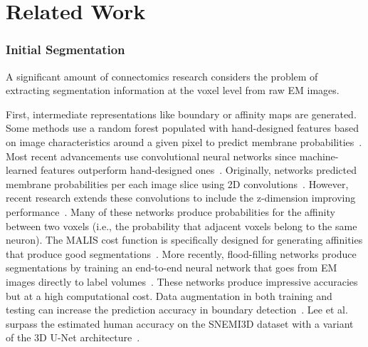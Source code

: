 
\section{Related Work}


\subsubsection{Initial Segmentation}
A significant amount of connectomics research considers the problem of extracting segmentation information at the voxel level from raw EM images.

First, intermediate representations like boundary or affinity maps are generated. Some methods use a random forest populated with hand-designed features based on image characteristics around a given pixel to predict membrane probabilities~\cite{kaynig2015large}.
Most recent advancements use convolutional neural networks since machine-learned features outperform hand-designed ones~\cite{bogovic2013learned}.
Originally, networks predicted membrane probabilities per each image slice using 2D convolutions~\cite{seymour2016rhoananet,ronneberger2015u,ciresan2012deep,jain2010boundary,kaynig2015large,amelio_segmentation}.
However, recent research extends these convolutions to include the z-dimension improving performance~\cite{lee2015recursive,parag2017anisotropic,cciccek20163d,turaga2010convolutional}.
Many of these networks produce probabilities for the affinity between two voxels (i.e., the probability that adjacent voxels belong to the same neuron). 
The MALIS cost function is specifically designed for generating affinities that produce good segmentations~\cite{briggman2009maximin}. 
More recently, flood-filling networks produce segmentations by training an end-to-end neural network that goes from EM images directly to label volumes~\cite{januszewski2016flood}. 
These networks produce impressive accuracies but at a high computational cost.
Data augmentation in both training and testing can increase the prediction accuracy in boundary detection~\cite{zeng2017deepem3d}.
Lee et al. surpass the estimated human accuracy on the SNEMI3D dataset with a variant of the 3D U-Net architecture~\cite{lee2017superhuman}.

